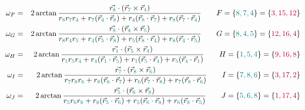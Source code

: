 \begin{enumerate}
\begin{eqnarray}
\nn\\
\omega_F &=& 
2 \arctan \frac{\vec{r_{\color{teal}8}} \cdot (\vec{r}_{\color{teal}7} \times \vec{r}_{\color{teal}4})}
{{r}_{\color{teal}8}{r}_{\color{teal}7}{r}_{\color{teal}4} 
+{r}_{\color{teal}7}(\vec{r}_{\color{teal}4}\cdot\vec{r}_{\color{teal}8}) 
+{r}_{\color{teal}4}(\vec{r}_{\color{teal}8}\cdot\vec{r}_{\color{teal}7}) 
+{r}_{\color{teal}8}(\vec{r}_{\color{teal}7}\cdot\vec{r}_{\color{teal}4})  }  
\qquad F=\{ {\color{teal} 8,7,4} \}=\{ {\color{purple} 3,15,12} \}
\nn\\
\omega_G &=& 
2 \arctan \frac{\vec{r_{\color{teal}8}} \cdot (\vec{r}_{\color{teal}4} \times \vec{r}_{\color{teal}5})}
{{r}_{\color{teal}8}{r}_{\color{teal}4}{r}_{\color{teal}5} 
+{r}_{\color{teal}4}(\vec{r}_{\color{teal}5}\cdot\vec{r}_{\color{teal}8}) 
+{r}_{\color{teal}5}(\vec{r}_{\color{teal}8}\cdot\vec{r}_{\color{teal}4}) 
+{r}_{\color{teal}8}(\vec{r}_{\color{teal}4}\cdot\vec{r}_{\color{teal}5})  }  
\qquad G=\{ {\color{teal}8,4,5} \}=\{ {\color{purple} 12,16,4} \}
\nn\\
\omega_H &=& 
2 \arctan \frac{\vec{r_{\color{teal}1}} \cdot (\vec{r}_{\color{teal}5} \times \vec{r}_{\color{teal}4})}
{{r}_{\color{teal}1}{r}_{\color{teal}5}{r}_{\color{teal}4} 
+{r}_{\color{teal}4}(\vec{r}_{\color{teal}1}\cdot\vec{r}_{\color{teal}5}) 
+{r}_{\color{teal}1}(\vec{r}_{\color{teal}5}\cdot\vec{r}_{\color{teal}4}) 
+{r}_{\color{teal}5}(\vec{r}_{\color{teal}4}\cdot\vec{r}_{\color{teal}1})  }  
\qquad H=\{ {\color{teal}1,5,4} \}=\{ {\color{purple} 9,16,8} \}
\nn\\
\omega_I &=& 
2 \arctan \frac{\vec{r_{\color{teal}7}} \cdot (\vec{r}_{\color{teal}8} \times \vec{r}_{\color{teal}6})}
{{r}_{\color{teal}7}{r}_{\color{teal}8}{r}_{\color{teal}6} 
+{r}_{\color{teal}8}(\vec{r}_{\color{teal}6}\cdot\vec{r}_{\color{teal}7}) 
+{r}_{\color{teal}6}(\vec{r}_{\color{teal}7}\cdot\vec{r}_{\color{teal}8}) 
+{r}_{\color{teal}7}(\vec{r}_{\color{teal}8}\cdot\vec{r}_{\color{teal}6})  }  
\qquad I=\{ {\color{teal}7,8,6}\}=\{ {\color{purple} 3,17,2} \}
\nn\\
\omega_J &=& 
2 \arctan \frac{\vec{r_{\color{teal}5}} \cdot (\vec{r}_{\color{teal}6} \times \vec{r}_{\color{teal}8})}
{{r}_{\color{teal}5}{r}_{\color{teal}6}{r}_{\color{teal}8} 
+{r}_{\color{teal}8}(\vec{r}_{\color{teal}5}\cdot\vec{r}_{\color{teal}6}) 
+{r}_{\color{teal}5}(\vec{r}_{\color{teal}6}\cdot\vec{r}_{\color{teal}8}) 
+{r}_{\color{teal}6}(\vec{r}_{\color{teal}8}\cdot\vec{r}_{\color{teal}5})  }  
\qquad J=\{ {\color{teal}5,6,8}\}=\{ {\color{purple} 1,17,4} \}
\nn\\

\end{eqnarray}
\end{enumerate}
